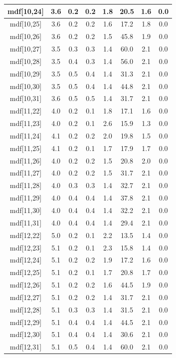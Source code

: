 \begin{longtable}{|c|c|c|c|c|c|c|c|}
\hline
mdf[10,24] & 3.6 & 0.2 & 0.2 & 1.8 & 20.5 & 1.6 & 0.0 \\
\hline
mdf[10,25] & 3.6 & 0.2 & 0.2 & 1.6 & 17.2 & 1.8 & 0.0 \\
\hline
mdf[10,26] & 3.6 & 0.2 & 0.2 & 1.5 & 45.8 & 1.9 & 0.0 \\
\hline
mdf[10,27] & 3.5 & 0.3 & 0.3 & 1.4 & 60.0 & 2.1 & 0.0 \\
\hline
mdf[10,28] & 3.5 & 0.4 & 0.3 & 1.4 & 56.0 & 2.1 & 0.0 \\
\hline
mdf[10,29] & 3.5 & 0.5 & 0.4 & 1.4 & 31.3 & 2.1 & 0.0 \\
\hline
mdf[10,30] & 3.5 & 0.5 & 0.4 & 1.4 & 44.8 & 2.1 & 0.0 \\
\hline
mdf[10,31] & 3.6 & 0.5 & 0.5 & 1.4 & 31.7 & 2.1 & 0.0 \\
\hline
mdf[11,22] & 4.0 & 0.2 & 0.1 & 1.8 & 17.1 & 1.6 & 0.0 \\
\hline
mdf[11,23] & 4.0 & 0.2 & 0.1 & 2.6 & 15.9 & 1.3 & 0.0 \\
\hline
mdf[11,24] & 4.1 & 0.2 & 0.2 & 2.0 & 19.8 & 1.5 & 0.0 \\
\hline
mdf[11,25] & 4.1 & 0.2 & 0.1 & 1.7 & 17.9 & 1.7 & 0.0 \\
\hline
mdf[11,26] & 4.0 & 0.2 & 0.2 & 1.5 & 20.8 & 2.0 & 0.0 \\
\hline
mdf[11,27] & 4.0 & 0.2 & 0.2 & 1.5 & 31.7 & 2.1 & 0.0 \\
\hline
mdf[11,28] & 4.0 & 0.3 & 0.3 & 1.4 & 32.7 & 2.1 & 0.0 \\
\hline
mdf[11,29] & 4.0 & 0.4 & 0.4 & 1.4 & 37.8 & 2.1 & 0.0 \\
\hline
mdf[11,30] & 4.0 & 0.4 & 0.4 & 1.4 & 32.2 & 2.1 & 0.0 \\
\hline
mdf[11,31] & 4.0 & 0.4 & 0.4 & 1.4 & 29.4 & 2.1 & 0.0 \\
\hline
mdf[12,22] & 5.0 & 0.2 & 0.1 & 2.2 & 13.5 & 1.4 & 0.0 \\
\hline
mdf[12,23] & 5.1 & 0.2 & 0.1 & 2.3 & 15.8 & 1.4 & 0.0 \\
\hline
mdf[12,24] & 5.1 & 0.2 & 0.2 & 1.9 & 17.2 & 1.6 & 0.0 \\
\hline
mdf[12,25] & 5.1 & 0.2 & 0.1 & 1.7 & 20.8 & 1.7 & 0.0 \\
\hline
mdf[12,26] & 5.1 & 0.2 & 0.2 & 1.6 & 44.5 & 1.9 & 0.0 \\
\hline
mdf[12,27] & 5.1 & 0.2 & 0.2 & 1.4 & 31.7 & 2.1 & 0.0 \\
\hline
mdf[12,28] & 5.1 & 0.3 & 0.3 & 1.4 & 31.5 & 2.1 & 0.0 \\
\hline
mdf[12,29] & 5.1 & 0.4 & 0.4 & 1.4 & 44.5 & 2.1 & 0.0 \\
\hline
mdf[12,30] & 5.1 & 0.4 & 0.4 & 1.4 & 30.6 & 2.1 & 0.0 \\
\hline
mdf[12,31] & 5.1 & 0.5 & 0.4 & 1.4 & 60.0 & 2.1 & 0.0 \\
\hline
\end{longtable}
